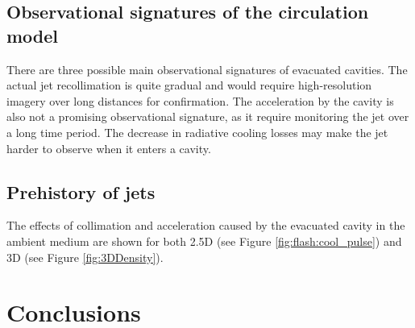 


\subsection{Observational signatures of the circulation model}

There are three possible main observational signatures of evacuated cavities.
The actual jet recollimation is quite gradual and would require high-resolution imagery over long distances for confirmation.
The acceleration by the cavity is also not a promising observational signature, as it require monitoring the jet over a long time period.
The decrease in radiative cooling losses may make the jet harder to observe when it enters a cavity.



\subsection{Prehistory of jets}
The effects of collimation and acceleration 
caused by the evacuated cavity in the ambient medium are shown for both 2.5D (see Figure \ref{fig:flash:cool_pulse})  and 3D (see Figure \ref{fig:3DDensity}).

\section{Conclusions}


